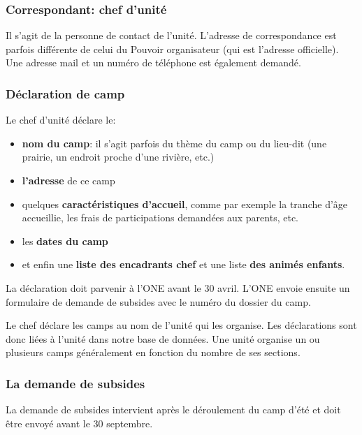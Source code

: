 \subsubsection{Correspondant: chef d'unité}
Il s'agit de la personne de contact de l'unité. L'adresse de correspondance est parfois différente de celui du Pouvoir organisateur (qui est l'adresse officielle). Une adresse mail et un numéro de téléphone est également demandé. 

\subsubsection{Déclaration de camp}
Le chef d'unité déclare le:
\begin{itemize}
    \item \textbf{nom du camp}: il s'agit parfois du thème du camp ou du lieu-dit (une prairie, un endroit proche d'une rivière, etc.)
    \item \textbf{l'adresse} de ce camp
    \item quelques \textbf{caractéristiques d'accueil}, comme par exemple la tranche d'âge accueillie, les frais de participations demandées aux parents, etc.
    \item les \textbf{dates du camp}
    \item et enfin une \textbf{liste des encadrants chef} et une liste \textbf{des animés enfants}.
\end{itemize}

La déclaration doit parvenir à l'ONE avant le 30 avril. L'ONE envoie ensuite un formulaire de demande de subsides avec le numéro du dossier du camp.

Le chef déclare les camps au nom de l'unité qui les organise. Les déclarations sont donc liées à l'unité dans notre base de données. Une unité organise un ou plusieurs camps généralement en fonction du nombre de ses sections. 




\subsubsection{La demande de subsides}
La demande de subsides intervient après le déroulement du camp d'été et doit être envoyé avant le 30 septembre. 

